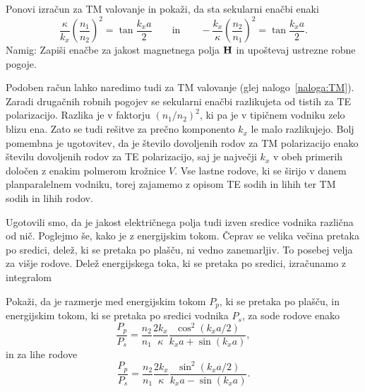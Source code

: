 \begin{definition}
\label{naloga:TM}
Ponovi izračun za TM valovanje in pokaži, da sta sekularni enačbi enaki 
\begin{equation}
\frac{\kappa}{k_x} \left(\frac{n_1}{n_2}\right)^2= 
\tan \frac{k_x a}{2} \qquad \mathrm{in} \qquad -\frac{k_x}{\kappa} \left(\frac{n_2}{n_1}\right)^2= 
\tan \frac{k_x a}{2}.
\end{equation}
Namig: Zapiši enačbe za jakost magnetnega polja ${\bf H}$ in upoštevaj ustrezne robne pogoje.
\end{definition}

Podoben račun lahko naredimo tudi za TM valovanje (glej nalogo~\ref{naloga:TM}). Zaradi drugačnih
robnih pogojev se sekularni enačbi razlikujeta od tistih za TE polarizacijo. Razlika je v
faktorju $(n_1/n_2)^2$, ki pa je v tipičnem vodniku zelo blizu ena. Zato se tudi rešitve 
za prečno komponento $k_x$ le malo razlikujejo. Bolj pomembna je ugotovitev, da je število
dovoljenih rodov za TM polarizacijo enako številu dovoljenih rodov za TE polarizacijo, 
saj je največji $k_x$ v obeh primerih določen z enakim polmerom krožnice $V$. 
Vse lastne rodove, ki se širijo v danem planparalelnem vodniku, torej zajamemo z opisom TE sodih in lihih ter 
TM sodih in lihih rodov.

Ugotovili smo, da je jakost električnega polja tudi izven sredice vodnika različna od nič. 
Poglejmo še, kako je z energijskim tokom. Čeprav se velika večina pretaka po sredici, 
delež, ki se pretaka po plašču, ni vedno zanemarljiv. To posebej velja za višje rodove. 
Delež energijskega toka, ki se pretaka po sredici, izračunamo
z integralom
\begin{definition}
Pokaži, da je razmerje med energijskim tokom $P_p$, ki se pretaka po plašču, in energijskim tokom, 
ki se pretaka po sredici vodnika $P_s$, za sode rodove enako
\begin{equation}
\frac{P_p}{P_s}= \frac{n_2}{n_1}\frac{2 k_x}{\kappa} \frac{\cos^2(k_x a/2)}{k_xa + \sin(k_xa)},
\end{equation}
in za lihe rodove
\begin{equation}
\frac{P_p}{P_s}= \frac{n_2}{n_1}\frac{2 k_x}{\kappa} \frac{\sin^2(k_x a/2)}{k_xa - \sin(k_xa)}.
\end{equation}
\end{definition}

